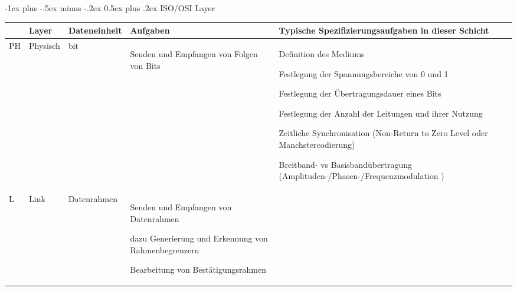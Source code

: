 \documentclass[10pt,landscape]{article}
\makeatletter
\renewcommand{\section}{\@startsection{section}{1}{0mm}%
                                {-1ex plus -.5ex minus -.2ex}%
                                {0.5ex plus .2ex}%
                                {\normalfont\large\bfseries}}
\makeatother
\begin{document}
\section{ISO/OSI Layer}
\begin{tabular}{ l | l | l | p{6cm} | p{10cm} }
       & \textbf{Layer} & \textbf{Dateneinheit}                  & \textbf{Aufgaben}                                 & \textbf{Typische Spezifizierungsaufgaben in dieser Schicht} \\\hline
    PH & Physisch       & bit                                    & \begin{itemize*}
        \item Senden und Empfangen von Folgen von Bits 
    \end{itemize*}                    & \begin{itemize*}
        \item Definition des Mediums
        \item Festlegung der Spannungsbereiche von 0 und 1
        \item Festlegung der Übertragungsdauer eines Bits
        \item Festlegung der Anzahl der Leitungen und ihrer Nutzung
        \item Zeitliche Synchronisation (Non-Return to Zero Level oder Manchstercodierung)
        \item Breitband- vs Basisbandübertragung (Amplituden-/Phasen-/Frequenzmodulation ) %
    \end{itemize*}                             \\\hline
    L  & Link           & Datenrahmen                            & \begin{itemize*}
        \item Senden und Empfangen von Datenrahmen
        \item dazu Generierung und Erkennung von Rahmenbegrenzern
        \item Bearbeitung von Bestätigungsrahmen

\end{itemize*}
\end{tabular}
\end{document}
